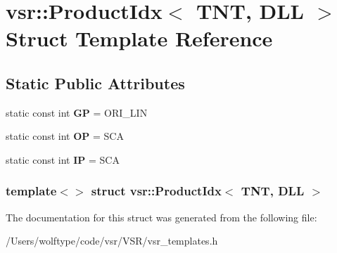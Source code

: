 \hypertarget{structvsr_1_1_product_idx_3_01_t_n_t_00_01_d_l_l_01_4}{\section{vsr\-:\-:Product\-Idx$<$ T\-N\-T, D\-L\-L $>$ Struct Template Reference}
\label{structvsr_1_1_product_idx_3_01_t_n_t_00_01_d_l_l_01_4}
}
\subsection*{Static Public Attributes}
\begin{DoxyCompactItemize}
\item 
\hypertarget{structvsr_1_1_product_idx_3_01_t_n_t_00_01_d_l_l_01_4_a0552d6cc8b55da2e004be5991d10145f}{static const int {\bfseries G\-P} = O\-R\-I\-\_\-\-L\-I\-N}\label{structvsr_1_1_product_idx_3_01_t_n_t_00_01_d_l_l_01_4_a0552d6cc8b55da2e004be5991d10145f}

\item 
\hypertarget{structvsr_1_1_product_idx_3_01_t_n_t_00_01_d_l_l_01_4_ad0af69fad43c9c321218c6516de78f32}{static const int {\bfseries O\-P} = S\-C\-A}\label{structvsr_1_1_product_idx_3_01_t_n_t_00_01_d_l_l_01_4_ad0af69fad43c9c321218c6516de78f32}

\item 
\hypertarget{structvsr_1_1_product_idx_3_01_t_n_t_00_01_d_l_l_01_4_a22b6424d5ad35f37995fa14b8c427fed}{static const int {\bfseries I\-P} = S\-C\-A}\label{structvsr_1_1_product_idx_3_01_t_n_t_00_01_d_l_l_01_4_a22b6424d5ad35f37995fa14b8c427fed}

\end{DoxyCompactItemize}
\subsubsection*{template$<$$>$ struct vsr\-::\-Product\-Idx$<$ T\-N\-T, D\-L\-L $>$}



The documentation for this struct was generated from the following file\-:\begin{DoxyCompactItemize}
\item 
/\-Users/wolftype/code/vsr/\-V\-S\-R/vsr\-\_\-templates.\-h\end{DoxyCompactItemize}
